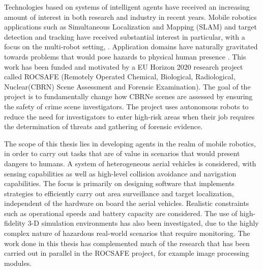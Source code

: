 
Technologies based on systems of intelligent agents have received an increasing amount of interest in both research and industry in recent years. Mobile robotics applications such as Simultaneous Localization and Mapping (SLAM)\cite{Thrun:2005:ProbabilisticRobotics} and target detection and tracking have received substantial interest in particular, with a focus on the multi-robot setting\cite{Saeedi2016Multiple-RobotReview}, \cite{Robin2016Multi-robotSurvey}. 
Application domains have naturally gravitated towards problems that would pose hazards to physical human presence \cite{Muller2014ApplicationSurvey}. This work has been funded and motivated by a EU Horizon 2020 research project called ROCSAFE (Remotely Operated Chemical, Biological, Radiological, Nuclear(CBRN) Scene Assessment and Forensic Examination)\cite{BagherzadehROCSAFE:Incidents}. The goal of the project is to fundamentally change how CBRNe scenes are assessed by ensuring the safety of crime scene investigators. The project uses autonomous robots to reduce the need for investigators to enter high-risk areas when their job requires the determination of threats and gathering of  forensic evidence.\par

The scope of this thesis lies in developing agents in the realm of mobile robotics, in order to carry out tasks that are of value in scenarios that would present dangers to humans. A system of heterogeneous aerial vehicles is considered, with sensing capabilities as well as high-level collision avoidance and navigation capabilities. The focus is primarily on designing software that implements strategies to efficiently carry out area surveillance and target localization, independent of the hardware on board the aerial vehicles. Realistic constraints such as operational speeds and battery capacity are considered. The use of high-fidelity 3-D simulation environments has also been investigated, due to the highly complex nature of hazardous real-world scenarios that require monitoring. The work done in this thesis has complemented much of the research that has been carried out in parallel in the ROCSAFE project, for example image processing modules.\par